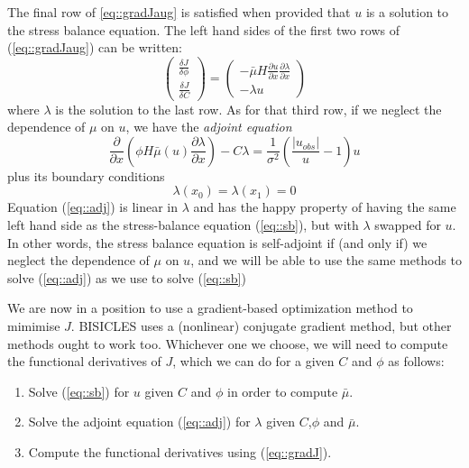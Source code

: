 \documentclass{article}
\begin{document}
The final row of \ref{eq::gradJaug} is satisfied when provided that $u$ is a solution to the stress balance equation.
The left hand sides of the first two rows of (\ref{eq::gradJaug}) can be written:
\begin{equation}
\label{eq::gradJ}
\left (
\begin{array}{l}
\frac{\delta J}{\delta \phi} \\
\frac{\delta J}{\delta C} 
\end{array} 
\right ) = \left ( 
\begin{array}{l}
  - \bar{\mu} H \frac{\partial u}{\partial x}\frac{\partial \lambda}{\partial x} \\
  - \lambda u
\end{array} 
\right )
\end{equation}
where $\lambda$ is the solution to the last row. As for that third row, if we neglect the dependence of $\mu$ on $u$,
we have the \emph{adjoint equation} 
\begin{equation}
\label{eq::adj}
\frac{\partial}{\partial x} \left ( \phi H \bar{\mu}(u)  \frac{\partial \lambda}{\partial x} \right ) - C \lambda  = \frac{1}{\sigma^2} \left ( \frac{|u_{obs}|}{u} - 1 \right ) u 
\end{equation}
plus its boundary conditions
\begin{equation}
\lambda(x_0) = \lambda(x_1) = 0
\end{equation}
Equation (\ref{eq::adj}) is linear in $\lambda$ and 
has the happy property of having the same left hand side as the stress-balance equation (\ref{eq::sb}), but with $\lambda$
swapped for $u$. In other words, the
stress balance equation is self-adjoint if (and only if) we neglect the dependence of $\mu$ on $u$, and we will be
able to use the same methods to solve (\ref{eq::adj}) as we use to solve (\ref{eq::sb})

We are now in a position to use a gradient-based optimization method to mimimise $J$. BISICLES uses a (nonlinear) conjugate gradient method, 
but other methods ought to work too. Whichever one we choose, we will need to compute the functional derivatives of
$J$, which we can do for a given $C$ and $\phi$ as follows:
\begin{enumerate}
\item{Solve (\ref{eq::sb}) for $u$ given $C$ and $\phi$ in order to compute $\bar{\mu}$.}
\item{Solve the adjoint equation (\ref{eq::adj}) for $\lambda$ given $C$,$\phi$ and $\bar{\mu}$.}
\item{Compute the functional derivatives using (\ref{eq::gradJ}).}
\end{enumerate}
\end{document}
